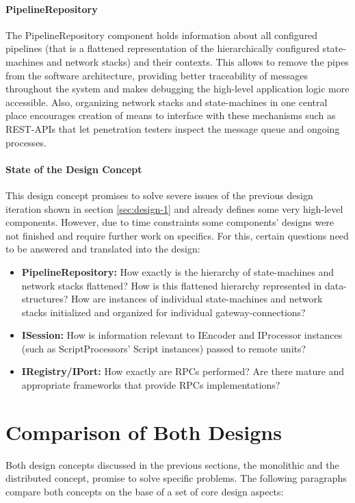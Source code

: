 \paragraph{PipelineRepository} The PipelineRepository component holds information about all configured pipelines (that is a flattened representation of the hierarchically configured state-machines and network stacks) and their contexts. This allows to remove the pipes from the software architecture, providing better traceability of messages throughout the system and makes debugging the high-level application logic more accessible. Also, organizing network stacks and state-machines in one central place encourages creation of means to interface with these mechanisms such as \ac{REST}-\acp{API} that let penetration testers inspect the message queue and ongoing processes.

\paragraph{State of the Design Concept} This design concept promises to solve severe issues of the previous design iteration shown in section \ref{sec:design-1} and already defines some very high-level components. However, due to time constraints some components' designs were not  finished and require further work on specifics. For this, certain questions need to be answered and translated into the design:
\begin{itemize}
    \item \textbf{PipelineRepository:} How exactly is the hierarchy of state-machines and network stacks flattened? How is this flattened hierarchy represented in data-structures? How are instances of individual state-machines and network stacks initialized and organized for individual gateway-connections?
    \item \textbf{ISession:} How is information relevant to IEncoder and IProcessor instances (such as ScriptProcessors' Script instances) passed to remote units?
    \item \textbf{IRegistry/IPort:} How exactly are \acp{RPC} performed? Are there mature and appropriate frameworks that provide \acp{RPC} implementations?
\end{itemize}


\section{Comparison of Both Designs}
\label{sec:design-comparison}
Both design concepts discussed in the previous sections, the monolithic and the distributed concept, promise to solve specific problems. The following paragraphs compare both concepts on the base of a set of core design aspects:
